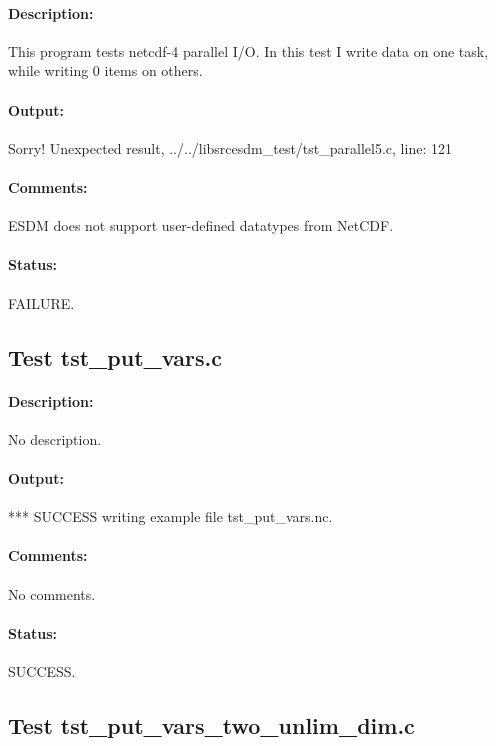 \paragraph{Description:} This program tests netcdf-4 parallel I/O. In this test I write data on one task, while writing 0 items on others.

\paragraph{Output:} Sorry! Unexpected result, ../../libsrcesdm\_test/tst\_parallel5.c, line: 121

\paragraph{Comments:} ESDM does not support user-defined datatypes from NetCDF.

\paragraph{Status:} FAILURE.

\subsection{Test tst\_put\_vars.c}

\paragraph{Description:} No description.

\paragraph{Output:} *** SUCCESS writing example file tst\_put\_vars.nc.

\paragraph{Comments:} No comments.

\paragraph{Status:} SUCCESS.

\subsection{Test tst\_put\_vars\_two\_unlim\_dim.c}

